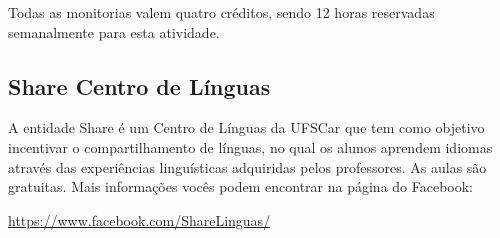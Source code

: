 Todas as monitorias valem quatro créditos, sendo 12 horas reservadas semanalmente para esta atividade.

\subsection{Share Centro de Línguas}
A entidade Share é um Centro de Línguas da UFSCar que tem como objetivo incentivar o compartilhamento de línguas, no qual os alunos aprendem idiomas através das experiências linguísticas adquiridas pelos professores. As aulas são gratuitas.
Mais informações vocês podem encontrar na página do Facebook:

\url{https://www.facebook.com/ShareLinguas/}